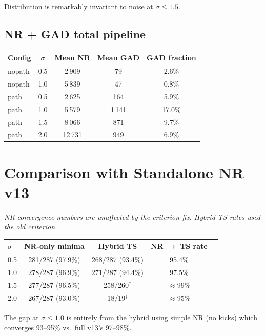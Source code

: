 \documentclass[11pt,a4paper]{article}
\begin{document}
Distribution is remarkably invariant to noise at $\sigma \leq 1.5$.

\subsection{NR + GAD total pipeline}

\begin{center}
\begin{tabular}{lcccc}
\toprule
Config & $\sigma$ & Mean NR & Mean GAD & GAD fraction \\
\midrule
nopath & 0.5 & 2\,909 & 79   & 2.6\% \\
nopath & 1.0 & 5\,839 & 47   & 0.8\% \\
\midrule
path   & 0.5 & 2\,625 & 164  & 5.9\% \\
path   & 1.0 & 5\,579 & 1\,141 & 17.0\% \\
path   & 1.5 & 8\,066 & 871  & 9.7\% \\
path   & 2.0 & 12\,731 & 949 & 6.9\% \\
\bottomrule
\end{tabular}
\end{center}

\section{Comparison with Standalone NR v13}
\label{app:standalone}

\textit{NR convergence numbers are unaffected by the criterion fix.
Hybrid TS rates used the old criterion.}

\begin{center}
\begin{tabular}{lcccc}
\toprule
$\sigma$ & NR-only minima & Hybrid TS & NR $\to$ TS rate \\
\midrule
0.5 & 281/287 (97.9\%) & 268/287 (93.4\%) & 95.4\% \\
1.0 & 278/287 (96.9\%) & 271/287 (94.4\%) & 97.5\% \\
1.5 & 277/287 (96.5\%) & 258/260$^*$ & $\approx$99\% \\
2.0 & 267/287 (93.0\%) & 18/19$^\dagger$ & $\approx$95\% \\
\bottomrule
\end{tabular}
\end{center}

The gap at $\sigma \leq 1.0$ is entirely from the hybrid using simple NR (no
kicks) which converges 93--95\% vs.\ full v13's 97--98\%.
\end{document}
